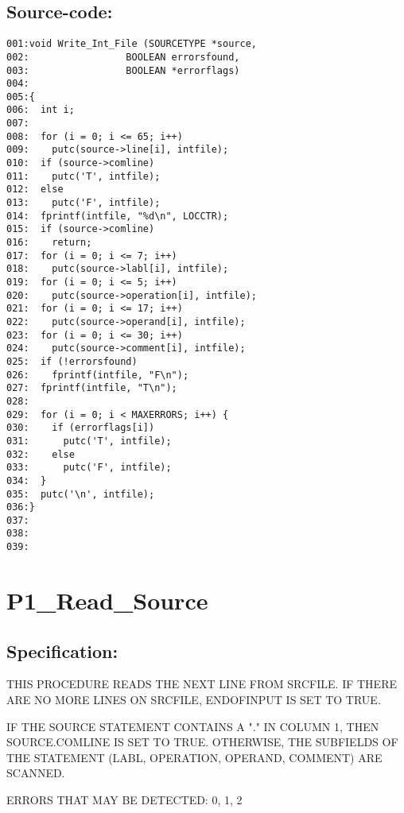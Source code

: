 \subsection*{Source-code:}
\begin{verbatim}
001:void Write_Int_File (SOURCETYPE *source,
002:                 BOOLEAN errorsfound,
003:                 BOOLEAN *errorflags)
004:
005:{
006:  int i;
007:
008:  for (i = 0; i <= 65; i++)
009:    putc(source->line[i], intfile);
010:  if (source->comline)
011:    putc('T', intfile);
012:  else
013:    putc('F', intfile);
014:  fprintf(intfile, "%d\n", LOCCTR);
015:  if (source->comline)
016:    return;
017:  for (i = 0; i <= 7; i++)
018:    putc(source->labl[i], intfile);
019:  for (i = 0; i <= 5; i++)
020:    putc(source->operation[i], intfile);
021:  for (i = 0; i <= 17; i++)
022:    putc(source->operand[i], intfile);
023:  for (i = 0; i <= 30; i++)
024:    putc(source->comment[i], intfile);
025:  if (!errorsfound)
026:    fprintf(intfile, "F\n");
027:  fprintf(intfile, "T\n");
028:
029:  for (i = 0; i < MAXERRORS; i++) {
030:    if (errorflags[i])
031:      putc('T', intfile);
032:    else
033:      putc('F', intfile);
034:  }
035:  putc('\n', intfile);
036:}
037:
038:
039:
\end{verbatim}
\section{P1\_Read\_Source}
\subsection*{Specification:}
THIS PROCEDURE READS THE NEXT LINE FROM SRCFILE. IF THERE ARE NO MORE LINES
ON SRCFILE, ENDOFINPUT IS SET TO TRUE.

IF THE SOURCE STATEMENT CONTAINS A "." IN COLUMN 1, THEN SOURCE.COMLINE IS
SET TO TRUE. OTHERWISE, THE SUBFIELDS OF THE STATEMENT (LABL, OPERATION,
OPERAND, COMMENT) ARE SCANNED.

ERRORS THAT MAY BE DETECTED: 0, 1, 2
